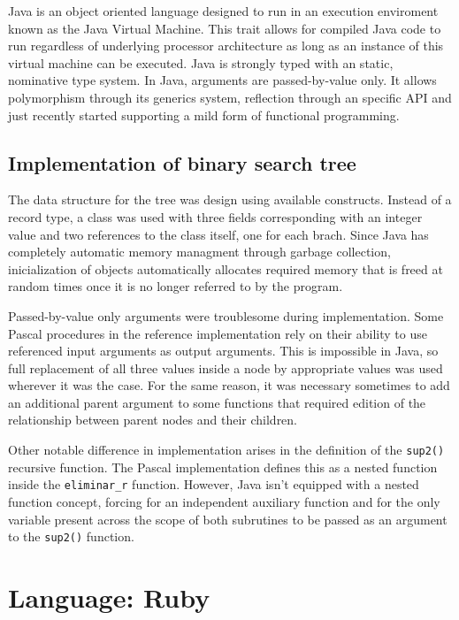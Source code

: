 \documentclass[11pt]{scrartcl} %
\begin{document}
Java is an object oriented language designed to run in an execution enviroment known as the Java Virtual Machine. This trait allows for compiled Java code to run regardless of underlying processor architecture as long as an instance of this virtual machine can be executed. Java is strongly typed with an static, nominative type system. In Java, arguments are passed-by-value only. It allows polymorphism through its generics system, reflection through an specific API and just recently started supporting a mild form of functional programming.

\subsection*{Implementation of binary search tree}

The data structure for the tree was design using available constructs. Instead of a record type, a class was used with three fields corresponding with an integer value and two references to the class itself, one for each brach. Since Java has completely automatic memory managment through garbage collection, inicialization of objects automatically allocates required memory that is freed at random times once it is no longer referred to by the program.

Passed-by-value only arguments were troublesome during implementation. Some Pascal procedures in the reference implementation rely on their ability to use referenced input arguments as output arguments. This is impossible in Java, so full replacement of all three values inside a node by appropriate values was used wherever it was the case. For the same reason, it was necessary sometimes to add an additional parent argument to some functions that required edition of the relationship between parent nodes and their children.

Other notable difference in implementation arises in the definition of the \texttt{sup2()} recursive function. The Pascal implementation defines this as a nested function inside the \texttt{eliminar\_r} function. However, Java isn't equipped with a nested function concept, forcing for an independent auxiliary function and for the only variable present across the scope of both subrutines to be passed as an argument to the \texttt{sup2()} function.

\section{Language: Ruby}
\end{document}

